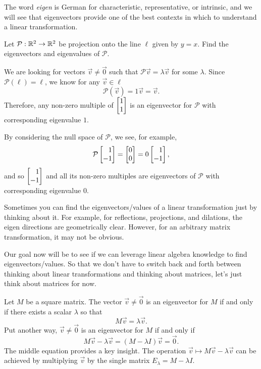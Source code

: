 
The word \emph{eigen} is German for characteristic, representative, or intrinsic, and
we will see that eigenvectors provide one of the best contexts in which to understand a linear transformation.

\begin{example}
	Let $\mathcal P:\mathbb{R}^2\to\mathbb{R}^2$ be projection onto the line $\ell$ given by $y=x$.
	Find the eigenvectors and eigenvalues of $\mathcal P$.

	We are looking for vectors $\vec v\neq \vec 0$ such that $\mathcal P\vec v=\lambda \vec v$ for some $\lambda$.
	Since $\mathcal P(\ell)=\ell$, we know for any $\vec v\in \ell$
	\[
		\mathcal P(\vec v)=1\vec v=\vec v.
	\]
	Therefore, any non-zero multiple of $\mat{1\\1}$ is an eigenvector for $\mathcal P$ with corresponding
	eigenvalue $1$.

	By considering the null space of $\mathcal P$, we see, for example,
	\[
		\mathcal P\mat{1\\-1}=\mat{0\\0}=0\mat{1\\-1},
	\]
	and so $\mat{1\\-1}$ and all its non-zero multiples are eigenvectors of $\mathcal P$ with corresponding
	eigenvalue $0$.
\end{example}


Sometimes you can find the eigenvectors/values of a linear transformation just by thinking about it.
For example, for reflections, projections, and dilations, the eigen directions
are geometrically clear. However, for an arbitrary matrix transformation, it may not be obvious.

Our goal now will be to see if we can leverage linear algebra knowledge to find eigenvectors/values.
So that we don't have to switch back and forth
between thinking about linear transformations and thinking about matrices, let's just think about matrices for now.

Let $M$ be a square matrix. The vector $\vec v\neq \vec 0$
is an eigenvector for $M$ if and only if there exists a scalar $\lambda$ so that
\begin{equation}
	\label{EQEIGEN}
	M\vec v=\lambda \vec v.
\end{equation}
Put another way, $\vec v\neq \vec 0$ is an eigenvector for $M$ if and only if
\[
	M\vec v-\lambda \vec v=(M-\lambda I)\vec v=\vec 0.
\]
The middle equation provides a key insight. The operation $\vec v\mapsto M\vec v-\lambda\vec v$ can be achieved
by multiplying $\vec v$ by the single matrix $E_\lambda=M-\lambda I$.

